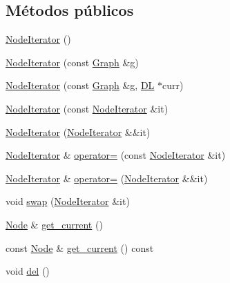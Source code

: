 \subsection*{Métodos públicos}
\begin{DoxyCompactItemize}
\item 
\hyperlink{class_designar_1_1_graph_1_1_node_iterator_a0449a6ba6cd5d43c04567210a8a064b1}{Node\+Iterator} ()
\item 
\hyperlink{class_designar_1_1_graph_1_1_node_iterator_a646f28f9dbd99df7317dd0cf22122f42}{Node\+Iterator} (const \hyperlink{class_designar_1_1_graph}{Graph} \&g)
\item 
\hyperlink{class_designar_1_1_graph_1_1_node_iterator_abc568563840c41429af62d925d45afc6}{Node\+Iterator} (const \hyperlink{class_designar_1_1_graph}{Graph} \&g, \hyperlink{class_designar_1_1_d_l}{DL} $\ast$curr)
\item 
\hyperlink{class_designar_1_1_graph_1_1_node_iterator_a40d0aa3fa7ccc2036d94244fe6a49636}{Node\+Iterator} (const \hyperlink{class_designar_1_1_graph_1_1_node_iterator}{Node\+Iterator} \&it)
\item 
\hyperlink{class_designar_1_1_graph_1_1_node_iterator_ada36544eee3fdca80d6bee17a48a1638}{Node\+Iterator} (\hyperlink{class_designar_1_1_graph_1_1_node_iterator}{Node\+Iterator} \&\&it)
\item 
\hyperlink{class_designar_1_1_graph_1_1_node_iterator}{Node\+Iterator} \& \hyperlink{class_designar_1_1_graph_1_1_node_iterator_a719ff82b05657c0a0667f4f953ec669d}{operator=} (const \hyperlink{class_designar_1_1_graph_1_1_node_iterator}{Node\+Iterator} \&it)
\item 
\hyperlink{class_designar_1_1_graph_1_1_node_iterator}{Node\+Iterator} \& \hyperlink{class_designar_1_1_graph_1_1_node_iterator_aa2dc7e1b1ae8e683ae56aa8c236a3187}{operator=} (\hyperlink{class_designar_1_1_graph_1_1_node_iterator}{Node\+Iterator} \&\&it)
\item 
void \hyperlink{class_designar_1_1_graph_1_1_node_iterator_a041e58acb80dabbb11bbc54dfc141db6}{swap} (\hyperlink{class_designar_1_1_graph_1_1_node_iterator}{Node\+Iterator} \&it)
\item 
\hyperlink{class_designar_1_1_graph_a5dfc7dba9d092ac489c72e40390c37d0}{Node} \& \hyperlink{class_designar_1_1_graph_1_1_node_iterator_a79268477058bf2d213dc11581c12a125}{get\+\_\+current} ()
\item 
const \hyperlink{class_designar_1_1_graph_a5dfc7dba9d092ac489c72e40390c37d0}{Node} \& \hyperlink{class_designar_1_1_graph_1_1_node_iterator_ad616e03e33435abfe6034a76ea5e2ecf}{get\+\_\+current} () const
\item 
void \hyperlink{class_designar_1_1_graph_1_1_node_iterator_a8ff7d2de6b10d3fd60774db675340259}{del} ()
\end{DoxyCompactItemize}
